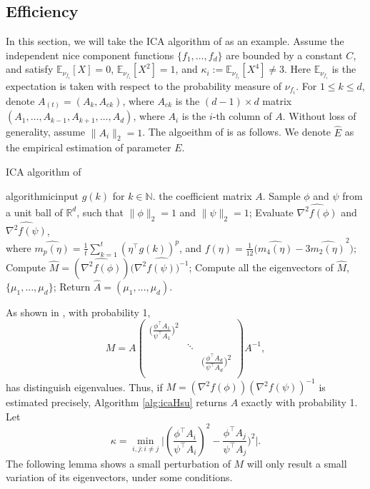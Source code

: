 \documentclass[english]{article} %
\newcommand{\E}{\mathbb{E}}
\newcommand{\real}{\mathbb{R}}
\renewcommand{\natural}{\mathbb{N}}
\theoremstyle{plain}
\theoremstyle{definition}
\theoremstyle{remark}
\begin{document}
\subsection{Efficiency}
In this section, we will take the ICA algorithm of \citet{DHsu2012} as an example. 
Assume the independent nice component functions $\{f_1,\ldots,f_d\}$ are bounded by a constant $C$, and satisfy $\E_{\nu_{f_i}}[X]=0$, $\E_{\nu_{f_i}}[X^2]=1$, and $\kappa_i := \E_{\nu_{f_i}}[X^4]\neq 3$. 
Here $\E_{\nu_{f_i}}$ is the expectation is taken with respect to the probability measure of $\nu_{f_i}$. 
For $1\le k\le d$, denote $A_{(t)} = (A_k,A_{ck})$, where $A_{ck}$ is the $(d-1)\times d$ matrix $(A_1,\ldots,A_{k-1},A_{k+1},\ldots,A_d)$, where $A_i$ is the $i$-th column of $A$. 
Without loss of generality, assume $\|A_i\|_2=1$.
The algoeithm of \citet{DHsu2012} is as follows. We denote $\widehat{E}$ as the empirical estimation of parameter $E$. 
\begin{algorithm}[H]
\caption{ICA algorithm of \citet{DHsu2012} \label{alg:icaHsu}}
\begin{algorithmic}[1]
\INPUT algorithmicinput $g(k)$ for $k\in\natural$.
\OUTPUT the coefficient matrix $A$. 
\STATE Sample $\phi$ and $\psi$ from a unit ball of $\real^d$, such that $\|\phi\|_2 = 1$ and $\|\psi\|_2 = 1$;
\STATE Evaluate $\widehat{\nabla^2f(\phi)}$ and $\widehat{\nabla^2f(\psi)}$, \\
\quad where $\widehat{m_p(\eta)} = \frac{1}{t}\sum_{k=1}^{t} (\eta^{\top}g(k))^p$, and $f(\eta) = \frac{1}{12}\big(\widehat{m_4(\eta)} - 3\widehat{m_2(\eta)}^2 \big)$;
\STATE Compute $\widehat{M} = (\widehat{\nabla^2f(\phi)})(\widehat{\nabla^2f(\psi))^{-1}}$;
\STATE Compute all the eigenvectors of $\widehat{M}$, $\{\mu_1,\ldots,\mu_d\}$;
\STATE Return $\widehat{A} = (\mu_1,\ldots,\mu_d)$.
\end{algorithmic}
\end{algorithm}

As shown in \citep{DHsu2012}, with probability 1,
\begin{equation}
\label{eq:M}
M = A 
\left(
\begin{array}{ccc}
\big(\frac{\phi^{\top}A_1}{\psi^{\top}A_1}\big)^2 & &\\
    & \ddots & \\
    & & \big(\frac{\phi^{\top}A_d}{\psi^{\top}A_d}\big)^2\\
\end{array} 
\right) 
A^{-1},
\end{equation}
has distinguish eigenvalues. Thus, if $M =(\nabla^2f(\phi))(\nabla^2f(\psi))^{-1} $ is estimated precisely, Algorithm \ref{alg:icaHsu} returns $A$ exactly  with probability 1. 
Let 
\begin{equation}
\label{def:kappa}
\kappa =  \min_{i,j: i\neq j} \vert (\frac{\phi^{\top}A_i}{\psi^{\top}A_i})^2 - \frac{\phi^{\top}A_j}{\psi^{\top}A_j})^2 \vert. 
\end{equation}
The following lemma shows a small perturbation of $M$ will only result a small variation of its eigenvectors, under some conditions.
\end{document}
